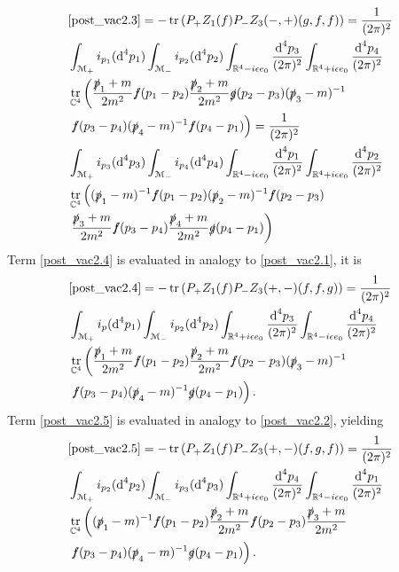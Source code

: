 \documentclass[oneside,reqno,12pt]{amsart}
\DeclareMathOperator{\tr}{tr}
\begin{document}
\begin{align*}
&\eqref{post_vac2.3}=- \tr\left(P_+ Z_1(f)P_- Z_3(-,+)(g,f,f)\right)=\frac{1}{(2\pi)^2}\\
&\int_{\mathcal{M_+}}  i_{p_1}(\text{d}^4p_{1}) 
\int_{\mathcal{M_-}}  i_{p_2}(\text{d}^4p_{2})
\int_{\mathbb{R}^4-i \epsilon e_0}\frac{\text{d}^4p_3}{(2\pi)^{2}}
\int_{\mathbb{R}^4+i \epsilon e_0}\frac{\text{d}^4p_4}{(2\pi)^{2}}
 \\
&\tr_{\mathbb{C}^4}\left(\frac{\slashed{p}_1+m}{2m^2} \slashed{f}(p_{1}-p_{2})
 \frac{\slashed{p}_{2}+m}{2m^2} 
\slashed{g}(p_{2}-p_3)  (\slashed{p}_3-m)^{-1} \right.\\
&\left. \slashed{f}(p_{3}-p_4)  (\slashed{p}_4-m)^{-1} \slashed{f}(p_{4}-p_{1})\right)
=\frac{1}{(2\pi)^2}\\
&\int_{\mathcal{M_+}}  i_{p_3}(\text{d}^4p_{3}) 
\int_{\mathcal{M_-}}  i_{p_4}(\text{d}^4p_{4})
\int_{\mathbb{R}^4-i \epsilon e_0}\frac{\text{d}^4p_1}{(2\pi)^{2}}
\int_{\mathbb{R}^4+i \epsilon e_0}\frac{\text{d}^4p_2}{(2\pi)^{2}}
 \\
&\tr_{\mathbb{C}^4}\left( (\slashed{p}_1-m)^{-1}  \slashed{f}(p_{1}-p_2)  (\slashed{p}_2-m)^{-1} \slashed{f}(p_{2}-p_{3})   \right.\\
&\left.  \frac{\slashed{p}_3+m}{2m^2} \slashed{f}(p_{3}-p_{4})
 \frac{\slashed{p}_{4}+m}{2m^2} 
\slashed{g}(p_{4}-p_1)  \right)
\end{align*}
Term \eqref{post_vac2.4} is evaluated in analogy to \eqref{post_vac2.1}, it is
\begin{align*}
&\eqref{post_vac2.4}=- \tr\left(P_+ Z_1(f)P_- Z_3(+,-)(f,f,g)\right)=\frac{1}{(2\pi)^2}\\
&\int_{\mathcal{M_+}}  i_p(\text{d}^4p_{1}) 
\int_{\mathcal{M_-}}  i_{p_2}(\text{d}^4p_{2})
\int_{\mathbb{R}^4+i \epsilon e_0}\frac{\text{d}^4p_3}{(2\pi)^{2}}
\int_{\mathbb{R}^4-i \epsilon e_0}\frac{\text{d}^4p_4}{(2\pi)^{2}}
 \\
&\tr_{\mathbb{C}^4}\left(\frac{\slashed{p}_1+m}{2m^2} \slashed{f}(p_{1}-p_{2})
 \frac{\slashed{p}_{2}+m}{2m^2} 
   \slashed{f}(p_{2}-p_3)  (\slashed{p}_3-m)^{-1} \right.
\\
&\left. \slashed{f}(p_{3}-p_4)  (\slashed{p}_4-m)^{-1} \slashed{g}(p_{4}-p_{1})\right)
.\end{align*}
Term \eqref{post_vac2.5} is evaluated in analogy to \eqref{post_vac2.2}, yielding
\begin{align*}
&\eqref{post_vac2.5}=- \tr\left(P_+ Z_1(f)P_- Z_3(+,-)(f,g,f)\right)=\frac{1}{(2\pi)^2}\\
&\int_{\mathcal{M_+}}  i_{p_2}(\text{d}^4p_{2}) 
\int_{\mathcal{M_-}}  i_{p_3}(\text{d}^4p_{3})
\int_{\mathbb{R}^4+i \epsilon e_0}\frac{\text{d}^4p_4}{(2\pi)^{2}}
\int_{\mathbb{R}^4-i \epsilon e_0}\frac{\text{d}^4p_1}{(2\pi)^{2}}
 \\
&\tr_{\mathbb{C}^4}\left( (\slashed{p}_1-m)^{-1} \slashed{f}(p_{1}-p_{2})\frac{\slashed{p}_2+m}{2m^2} \slashed{f}(p_{2}-p_{3})
 \frac{\slashed{p}_{3}+m}{2m^2} \right.\\
&\left. \slashed{f}(p_{3}-p_4)  (\slashed{p}_4-m)^{-1} \slashed{g}(p_{4}-p_1)  \right)
.\end{align*}
\end{document}
